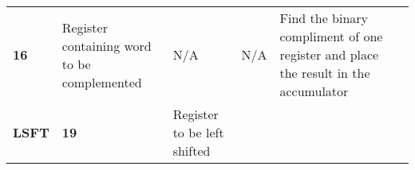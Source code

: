 \documentclass[]{article}
\begin{document}
\begin{longtable}[c]{@{}llllll@{}}
\begin{minipage}[t]{0.14\columnwidth}\raggedright\strut
\textbf{16}
\strut\end{minipage} &
\begin{minipage}[t]{0.14\columnwidth}\raggedright\strut
Register containing word to be complemented
\strut\end{minipage} &
\begin{minipage}[t]{0.14\columnwidth}\raggedright\strut
N/A
\strut\end{minipage} &
\begin{minipage}[t]{0.14\columnwidth}\raggedright\strut
N/A
\strut\end{minipage} &
\begin{minipage}[t]{0.14\columnwidth}\raggedright\strut
Find the binary compliment of one register and place the result in the
accumulator
\strut\end{minipage}\tabularnewline
\begin{minipage}[t]{0.14\columnwidth}\raggedright\strut
\textbf{LSFT}
\strut\end{minipage} &
\begin{minipage}[t]{0.14\columnwidth}\raggedright\strut
\textbf{19}
\strut\end{minipage} &
\begin{minipage}[t]{0.14\columnwidth}\raggedright\strut
Register to be left shifted


\end{minipage}
\end{longtable}
\end{document}
